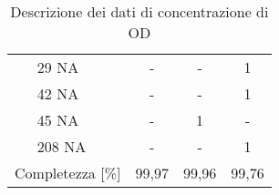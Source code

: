 \begin{table}
\begin{center}
\begin{tabular}{|ll|c|c|c|}
		& 29 NA                                    & -                                                                        & -                                                                     & 1                   \\ \cline{3-5} 
		& 42 NA                                    & -                                                                        & -                                                                     & 1                   \\ \cline{3-5} 
		& 45 NA                                    & -                                                                        & 1                                                                     & -                   \\ \cline{3-5} 
		& 208 NA                                   & -                                                                        & -                                                                     & 1                   \\ \hline
		\multicolumn{2}{|l|}{Completezza {[}\%{]}}                                                                    & 99,97                                                                    & 99,96                                                                 & 99,76               \\ \hline
	\end{tabular}
	\caption{Descrizione dei dati di concentrazione di OD}
	\label{tab:sa_c_OD}
\end{center}
\end{table}


